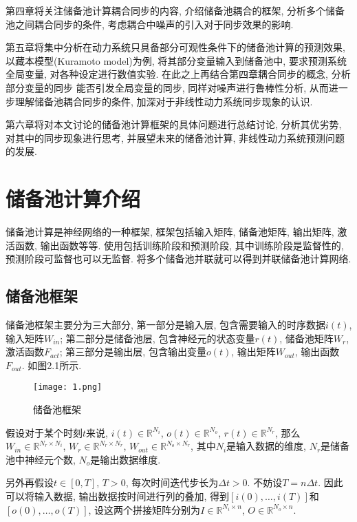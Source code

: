 \documentclass[notitlepage,cs4size,punct,oneside]{ctexrep}
\numberwithin{equation}{chapter}
\theoremstyle{mystyle}
\begin{document}
第四章将关注储备池计算耦合同步的内容, 介绍储备池耦合的框架, 
分析多个储备池之间耦合同步的条件, 考虑耦合中噪声的引入对于同步效果的影响. 

第五章将集中分析在动力系统只具备部分可观性条件下的储备池计算的预测效果, 
以藏本模型(Kuramoto model)为例, 将其部分变量输入到储备池中, 要求预测系统全局变量, 
对各种设定进行数值实验. 在此之上再结合第四章耦合同步的概念, 分析部分变量的同步
能否引发全局变量的同步, 同样对噪声进行鲁棒性分析, 从而进一步理解储备池耦合同步的条件, 
加深对于非线性动力系统同步现象的认识.  

第六章将对本文讨论的储备池计算框架的具体问题进行总结讨论, 分析其优劣势, 
对其中的同步现象进行思考, 并展望未来的储备池计算, 非线性动力系统预测问题的发展. 


\chapter{储备池计算介绍}
储备池计算是神经网络的一种框架, 
框架包括输入矩阵, 储备池矩阵, 输出矩阵, 激活函数, 输出函数等等. 
使用包括训练阶段和预测阶段, 其中训练阶段是监督性的, 预测阶段可监督也可以无监督. 
将多个储备池并联就可以得到并联储备池计算网络. 

\section{储备池框架}
储备池框架主要分为三大部分, 第一部分是输入层, 包含需要输入的时序数据$i(t)$, 
输入矩阵$W_{in}$; 第二部分是储备池层, 包含神经元的状态变量$r(t)$, 储备池矩阵$W_{r}$, 
激活函数$F_{act}$; 第三部分是输出层, 包含输出变量$o(t)$, 输出矩阵$W_{out}$, 
输出函数$F_{out}$. 如图2.1所示. 

\begin{figure}[htbp]
    \centering
    \texttt{[image: 1.png]}
    \caption{储备池框架}
\end{figure}

假设对于某个时刻$t$来说, 
$i(t)\in\mathbb{R}^{N_i}$, 
$o(t)\in\mathbb{R}^{N_o}$, $r(t)\in\mathbb{R}^{N_r}$, 
那么$W_{in}\in\mathbb{R}^{{N_r}\times{N_i}}$, 
$W_{r}\in\mathbb{R}^{{N_r}\times{N_r}}$,
$W_{out}\in\mathbb{R}^{{N_o}\times{N_r}}$,
其中$N_i$是输入数据的维度, $N_r$是储备池中神经元个数, 
$N_o$是输出数据维度. 

另外再假设$t\in[0, T]$, $T>0$, 每次时间迭代步长为$\Delta t>0$. 不妨设$T=n\Delta t$. 
因此可以将输入数据, 输出数据按时间进行列的叠加, 得到$[i(0), \dots, i(T)]$和$[o(0), \dots, o(T)]$, 
设这两个拼接矩阵分别为$I\in\mathbb{R}^{{N_i}\times n}$, $O\in\mathbb{R}^{{N_o}\times{n}}$.
\end{document}
